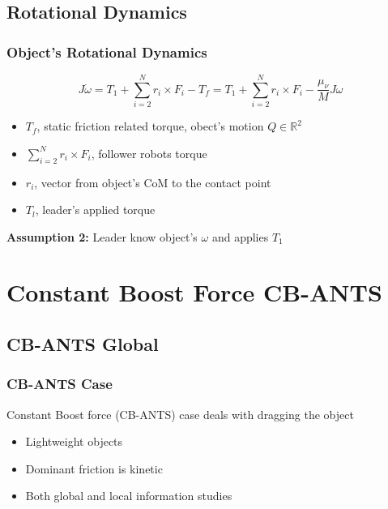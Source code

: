 \documentclass{beamer}
\begin{document}
\subsection{Rotational Dynamics}
\begin{frame}
\frametitle{Object's Rotational Dynamics}
\begin{equation}\label{rotDyn1}
J\dot{\omega}=T_1 +\sum_{i=2}^{N}r_i\times F_i-T_f=T_1 +\sum_{i=2}^{N}r_i\times F_i-\frac{\mu_{\nu}}{M}J\omega
\end{equation}
\begin{itemize}
\item $T_f$, static friction related torque, obect's motion $Q \in \mathbb{R}^2$
\item $\sum_{i=2}^{N}r_i\times F_i$, follower robots torque 
\item $r_i$, vector from object's CoM to the contact point 
\item $T_l$, leader's applied torque\vspace{.3cm}
\end{itemize}
\textbf{Assumption 2: }Leader know object's $\omega$ and applies $T_1$
\end{frame}

\section{Constant Boost Force CB-ANTS}
\subsection{CB-ANTS Global}
\begin{frame}
\frametitle{CB-ANTS Case}
Constant Boost force (CB-ANTS) case deals with dragging the object \vspace{.3cm}
\begin{itemize}
\item Lightweight objects\vspace{.3cm}
\item Dominant friction is kinetic\vspace{.3cm}
\item Both global and local information studies
\end{itemize}
\end{frame}

\end{document}
